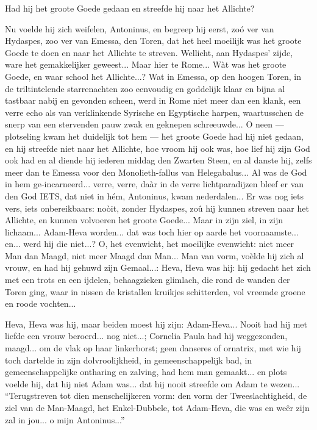 \documentclass[a4paper, 12pt, oneside, dutch]{article}
\begin{document}
Had hij het groote Goede gedaan en streefde hij naar het Allichte?

Nu voelde hij zich weifelen, Antoninus, en begreep hij eerst, zoó ver van Hydaspes, zoo ver van Emessa, den Toren, dat het heel moeilijk was het groote Goede te doen en naar het Allichte te streven. Wellicht, aan Hydaspes' zijde, ware het gemakkelijker geweest... Maar hier te Rome... Wàt was het groote Goede, en waar school het Allichte...? Wat in Emessa, op den hoogen Toren, in de triltintelende starrenachten zoo eenvoudig en goddelijk klaar en bijna al tastbaar nabij en gevonden scheen, werd in Rome niet meer dan een klank, een verre echo als van verklinkende Syrische en Egyptische harpen, waartusschen de snerp van een stervenden pauw zwak en geknepen schreeuwde... O neen --- plotseling kwam het duidelijk tot hem --- het groote Goede had hij niet gedaan, en hij streefde niet naar het Allichte, hoe vroom hij ook was, hoe lief hij zijn God ook had en al diende hij iederen middag den Zwarten Steen, en al danste hij, zelfs meer dan te Emessa voor den Monolieth-fallus van Helegabalus... Al was de God in hem ge-incarneerd... verre, verre, daàr in de verre lichtparadijzen bleef er van den God IETS, dat niet in hém, Antoninus, kwam nederdalen... Er was nog iets vers, iets onbereikbaars: noòit, zonder Hydaspes, zoû hij kunnen streven naar het Allichte, en kunnen volvoeren het groote Goede... Maar in zijn ziel, in zijn lichaam... Adam-Heva worden... dat was toch hier op aarde het voornaamste... en... werd hij die niet...? O, het evenwicht, het moeilijke evenwicht: niet meer Man dan Maagd, niet meer Maagd dan Man... Man van vorm, voèlde hij zich al vrouw, en had hij gehuwd zijn Gemaal...: Heva, Heva was hij: hij gedacht het zich met een trots en een ijdelen, behaagzieken glimlach, die rond de wanden der Toren ging, waar in nissen de kristallen kruikjes schitterden, vol vreemde groene en roode vochten...

Heva, Heva was hij, maar beiden moest hij zijn: Adam-Heva... Nooit had hij met liefde een vrouw beroerd... nog niet...; Cornelia Paula had hij weggezonden, maagd... om de vlak op haar linkerborst; geen danseres of ornatrix, met wie hij toch dartelde in zijn dolvroolijkheid, in gemeenschappelijk bad, in gemeenschappelijke ontharing en zalving, had hem man gemaakt... en plots voelde hij, dat hij niet Adam was... dat hij nooit streefde om Adam te wezen... "`Terugstreven tot dien menschelijkeren vorm: den vorm der Tweeslachtigheid, de ziel van de Man-Maagd, het Enkel-Dubbele, tot Adam-Heva, die was en weêr zijn zal in jou... o mijn Antoninus..."'
\end{document}

